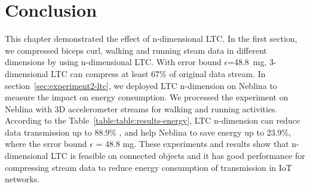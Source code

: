 \section{Conclusion}
This chapter demonstrated the effect of n-dimensional LTC. In the first section,
we compressed biceps curl, walking and running steam data in different
dimensions by using n-dimensional LTC. With error bound $\epsilon$=48.8\ mg,
3-dimensional LTC can compress at least 67\% of original data stream.
In section~\ref{sec:experiment2-ltc}, we deployed LTC n-dimension on Neblina to
measure the impact on energy consumption. We processed the experiment on Neblina
with 3D accelerometer streams for walking and running activities. According to
the Table~\ref{table:table:results-energy}, LTC n-dimension can reduce data
transmission up to 88.9\% , and help Neblina to save energy up to 23.9\%, where
the error bound $\epsilon$ = 48.8 mg. 
These experiments and results show that n-dimensional LTC is feasible on
connected objects and it has good performance for compressing stream data to
reduce energy consumption of transmission in IoT networks. 
